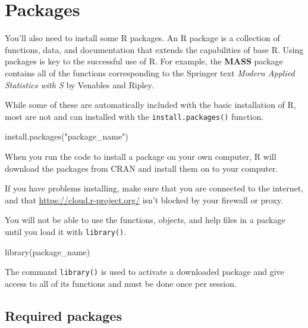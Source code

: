 \documentclass[
]{book}
\newenvironment{Shaded}{\begin{snugshade}}{\end{snugshade}}
\newcommand{\FunctionTok}[1]{\textcolor[rgb]{0.00,0.00,0.00}{#1}}
\newcommand{\NormalTok}[1]{#1}
\newcommand{\StringTok}[1]{\textcolor[rgb]{0.31,0.60,0.02}{#1}}
\begin{document}
\hypertarget{packages}{%
\section{Packages}\label{packages}}

You'll also need to install some R packages. An R package is a collection of functions, data, and documentation that extends the capabilities of base R. Using packages is key to the successful use of R. For example, the \textbf{MASS} package contains all of the functions corresponding to the Springer text \emph{Modern Applied Statistics with S} by Venables and Ripley.

While some of these are automatically included with the basic installation of R, most are not and can installed with the \texttt{install.packages()} function.

\begin{Shaded}
\begin{Highlighting}[]
\FunctionTok{install.packages}\NormalTok{(}\StringTok{"package\_name"}\NormalTok{)}
\end{Highlighting}
\end{Shaded}

When you run the code to install a package on your own computer, R will download the packages from CRAN and install them on to your computer.

If you have problems installing, make sure that you are connected to the internet, and that \url{https://cloud.r-project.org/} isn't blocked by your firewall or proxy.

You will not be able to use the functions, objects, and help files in a package until you load it with \texttt{library()}.

\begin{Shaded}
\begin{Highlighting}[]
\FunctionTok{library}\NormalTok{(package\_name)}
\end{Highlighting}
\end{Shaded}

The command \texttt{library()} is used to activate a downloaded package and give access to all of its functions and must be done once per session.

\hypertarget{required-packages}{%
\subsection*{Required packages}\label{required-packages}}
\end{document}
